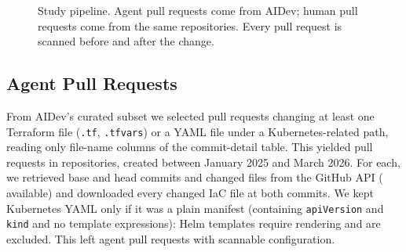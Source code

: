 \documentclass[10pt,conference]{IEEEtran}
\begin{document}
\begin{figure}[t]
\centering
{}
\caption{Study pipeline. Agent pull requests come from AIDev; human pull requests come from the same repositories. Every pull request is scanned before and after the change.}
\label{fig:pipeline}
\end{figure}

\subsection{Agent Pull Requests}
From AIDev's curated subset we selected pull requests changing at least one Terraform file (\texttt{.tf}, \texttt{.tfvars}) or a YAML file under a Kubernetes-related path, reading only file-name columns of the commit-detail table. This yielded \NaidevIac{} pull requests in \NaidevRepos{} repositories, created between January 2025 and March 2026. For each, we retrieved base and head commits and changed files from the GitHub API (\NagentFetched{} available) and downloaded every changed IaC file at both commits. We kept Kubernetes YAML only if it was a plain manifest (containing \texttt{apiVersion} and \texttt{kind} and no template expressions): Helm templates require rendering and are excluded. This left \NagentAll{} agent pull requests with scannable configuration.
\end{document}

